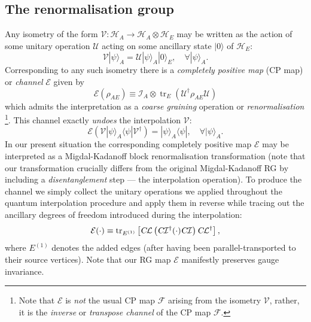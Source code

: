 \documentclass[twocolumn,lengthcheck,superscriptaddress]{revtex4-1}
\newcommand{\tr}{\operatorname{tr}}
\theoremstyle{definition}
\theoremstyle{remark}
\begin{document}
\subsection{The renormalisation group}
Any isometry of the form $\mathcal{V}:\mathcal{H}_A\rightarrow \mathcal{H}_A\otimes \mathcal{H}_E$ may be written as the action of some unitary operation $\mathcal{U}$ acting on some ancillary state $|0\rangle$ of $\mathcal{H}_E$: 
\begin{equation}
	\mathcal{V} |\psi\rangle_A = \mathcal{U}|\psi\rangle_A|0\rangle_E, \quad \forall |\psi\rangle_A.
\end{equation}
Corresponding to any such isometry there is a \emph{completely positive map} (CP map) or \emph{channel} $\mathcal{E}$ given by
\begin{equation}
	\mathcal{E}(\rho_{AE}) \equiv \mathcal{I}_{A} \otimes \tr_E ( \mathcal{U}^\dag \rho_{AE} \mathcal{U} )
\end{equation}
which admits the interpretation as a \emph{coarse graining} operation or \emph{renormalisation} \footnote{Note that $\mathcal{E}$ is \emph{not} the usual CP map $\mathcal{F}$ arising from the isometry $\mathcal{V}$, rather, it is the \emph{inverse} or \emph{transpose channel} of the CP map $\mathcal{F}$.}.  This channel exactly \emph{undoes} the interpolation $\mathcal{V}$: 
\begin{equation}
	\mathcal{E}(\mathcal{V}|\psi\rangle_A\langle\psi| \mathcal{V}^\dag) = |\psi\rangle_A\langle\psi|, \quad \forall |\psi\rangle_A.
\end{equation}
In our present situation the corresponding completely positive map $\mathcal{E}$ may be interpreted as a Migdal-Kadanoff block renormalisation transformation (note that our transformation crucially differs from the original Migdal-Kadanoff RG \cite{kadanoff:1976a,migdal:1975b,migdal:1975a} by including a \emph{disentanglement} step \cite{vidal:2006a,vidal:2007a} --- the interpolation operation). To produce the channel we simply collect the unitary operations we applied throughout the quantum interpolation procedure and apply them in reverse while tracing out the ancillary degrees of freedom introduced during the interpolation:
\begin{equation}
	\mathcal{E}(\cdot) \equiv   \tr_{E^{(1)}}\left[\textsl{C}\mathcal{L}\left(\textsl{C}\mathcal{I}^\dag(\cdot)\textsl{C}\mathcal{I}  \right )\textsl{C}\mathcal{L}^\dag\right],
\end{equation}
where $E^{(1)}$ denotes the added edges (after having been parallel-transported to their source vertices). Note that our RG map $\mathcal{E}$ manifestly preserves gauge invariance. 
\end{document}
